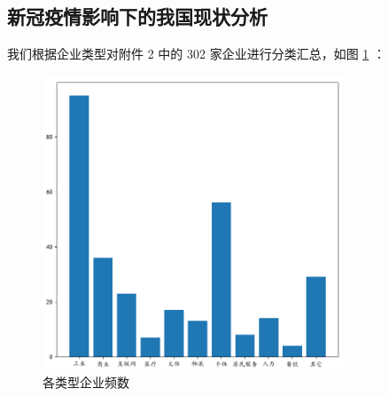\documentclass[withoutpreface,bwprint]{cumcmthesis}
\begin{document}
    \subsection{新冠疫情影响下的我国现状分析}
        我们根据企业类型对附件 2 中的 302 家企业进行分类汇总，如图 \ref{图：各类型企业频数} ：
        \begin{figure}[H]
            \centering
            \includegraphics[width = 0.8\textwidth, height = 0.4\textheight]{第三问企业分类柱形图.png}
            \caption{各类型企业频数}
            \label {图：各类型企业频数}
        \end{figure}
\end{document}
